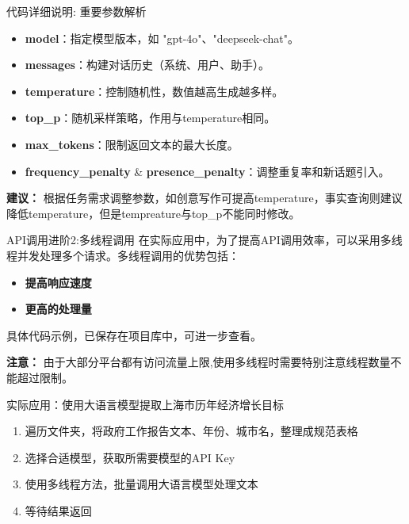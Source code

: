 \documentclass{beamer}
\begin{document}
\begin{frame}[fragile]{代码详细说明: 重要参数解析}
    \begin{itemize}
        \item \textbf{model}：指定模型版本，如 "gpt-4o"、"deepseek-chat"。
        \item \textbf{messages}：构建对话历史（系统、用户、助手）。
        \item \textbf{temperature}：控制随机性，数值越高生成越多样。
         \item \textbf{top\_p}：随机采样策略，作用与temperature相同。
        \item \textbf{max\_tokens}：限制返回文本的最大长度。
        \item \textbf{frequency\_penalty} \& \textbf{presence\_penalty}：调整重复率和新话题引入。
    \end{itemize}
    \medskip
    \textbf{建议：} 根据任务需求调整参数，如创意写作可提高temperature，事实查询则建议降低temperature，但是tempreature与top\_p不能同时修改。
\end{frame}

\begin{frame}[fragile]{API调用进阶2:多线程调用}
\small
    在实际应用中，为了提高API调用效率，可以采用多线程并发处理多个请求。多线程调用的优势包括：
    \begin{itemize}
        \item \textbf{提高响应速度} 
        \item \textbf{更高的处理量} 
    \end{itemize}
    具体代码示例，已保存在项目库中，可进一步查看。

    \textbf{注意：} 由于大部分平台都有访问流量上限,使用多线程时需要特别注意线程数量不能超过限制。
\end{frame}

\begin{frame}[fragile]{实际应用：使用大语言模型提取上海市历年经济增长目标}

	\begin{enumerate}
		\item 遍历文件夹，将政府工作报告文本、年份、城市名，整理成规范表格
		\item 选择合适模型，获取所需要模型的API Key
		\item 使用多线程方法，批量调用大语言模型处理文本
		\item 等待结果返回
	\end{enumerate}

\end{frame}
\end{document}
